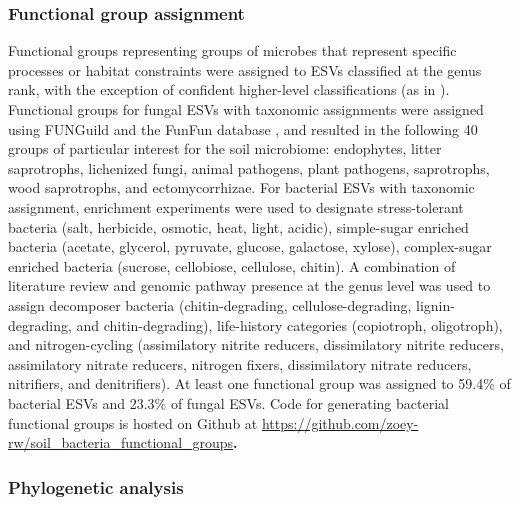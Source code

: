 \documentclass[11pt]{article}
\begin{document}
\subsubsection{Functional group assignment}

Functional groups representing groups of microbes that represent specific processes or habitat constraints \cite{scoma_functional_2021} were assigned to ESVs classified at the genus rank, with the exception of confident higher-level classifications (as in \cite{averill_soil_2021}). Functional groups for fungal ESVs with taxonomic assignments were assigned using FUNGuild \cite{nguyen_funguild_2016} and the FunFun database \cite{zanne_fungal_2020}, and resulted in the following 40 groups of particular interest for the soil microbiome: endophytes, litter saprotrophs, lichenized fungi, animal pathogens, plant pathogens, saprotrophs, wood saprotrophs, and ectomycorrhizae. For bacterial ESVs with taxonomic assignment, enrichment experiments \cite{naylor_deconstructing_2020} were used to designate stress-tolerant bacteria (salt, herbicide, osmotic, heat, light, acidic), simple-sugar enriched bacteria (acetate, glycerol, pyruvate, glucose, galactose, xylose), complex-sugar enriched bacteria (sucrose, cellobiose, cellulose, chitin). A combination of literature review \cite{Ho2017} and genomic pathway presence at the genus level \cite{Berlemont2013,Albright2018}  was used to assign decomposer bacteria (chitin-degrading, cellulose-degrading, lignin-degrading, and chitin-degrading), life-history categories (copiotroph, oligotroph), and nitrogen-cycling (assimilatory nitrite reducers, dissimilatory nitrite reducers, assimilatory nitrate reducers, nitrogen fixers, dissimilatory nitrate reducers, nitrifiers, and denitrifiers). At least one functional group was assigned to 59.4\% of bacterial ESVs and 23.3\% of fungal ESVs. Code for generating bacterial functional groups is hosted on Github at \href{https://github.com/zoey-rw/soil_bacteria_functional_groups/tree/main}{https://github.com/zoey-rw/soil\_bacteria\_functional\_groups}\textbf{.} 

\subsubsection{Phylogenetic analysis}
\end{document}
